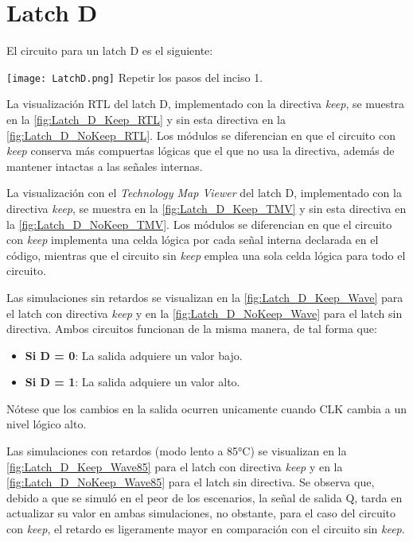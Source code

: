 \section{Latch D \label{sec:s2}}

\begin{center}
	\begin{minipage}{12cm}
		\begin{tcolorbox}[title=Actividad 2]
			El circuito para un latch D es el siguiente:\enter
			
				\texttt{[image: LatchD.png]}
			Repetir los pasos del inciso 1.
		\end{tcolorbox}	
	\end{minipage}
\end{center}

La visualización RTL del latch D, implementado con la directiva \textit{keep}, se muestra en la \autoref{fig:Latch_D_Keep_RTL} y sin esta directiva en la \autoref{fig:Latch_D_NoKeep_RTL}. Los módulos se diferencian en que el circuito con \textit{keep} conserva más compuertas lógicas que el que no usa la directiva, además de mantener intactas a las señales internas.

La visualización con el \textit{Technology Map Viewer} del latch D, implementado con la directiva \textit{keep}, se muestra en la \autoref{fig:Latch_D_Keep_TMV} y sin esta directiva en la \autoref{fig:Latch_D_NoKeep_TMV}. Los módulos se diferencian en que el circuito con \textit{keep} implementa una celda lógica por cada señal interna declarada en el código, mientras que el circuito sin \textit{keep} emplea una sola celda lógica para todo el circuito.

Las simulaciones sin retardos se visualizan en la \autoref{fig:Latch_D_Keep_Wave} para el latch con directiva \textit{keep} y en la \autoref{fig:Latch_D_NoKeep_Wave} para el latch sin directiva. Ambos circuitos funcionan de la misma manera, de tal forma que:

\begin{itemize}
	\item \textbf{Si D = 0}: La salida adquiere un valor bajo.
	\item \textbf{Si D = 1}: La salida adquiere un valor alto.
\end{itemize}

Nótese que los cambios en la salida ocurren unicamente cuando CLK cambia a un nivel lógico alto.

Las simulaciones con retardos (modo lento a 85°C) se visualizan en la \autoref{fig:Latch_D_Keep_Wave85} para el latch con directiva \textit{keep} y en la \autoref{fig:Latch_D_NoKeep_Wave85} para el latch sin directiva. Se observa que, debido a que se simuló en el peor de los escenarios, la señal de salida Q, tarda en actualizar su valor en ambas simulaciones, no obstante, para el caso del circuito con \textit{keep}, el retardo es ligeramente mayor en comparación con el circuito sin \textit{keep}.

